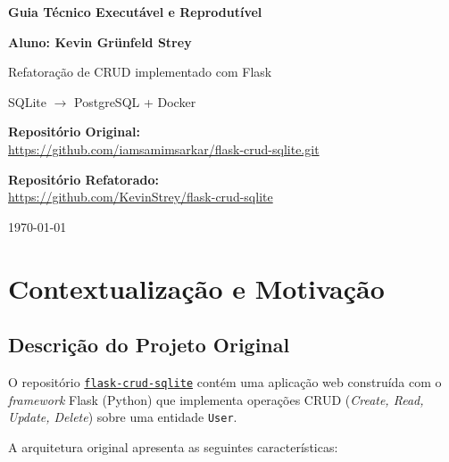 \documentclass[12pt,a4paper]{article}
\begin{document}
\begin{titlepage}
  \centering
  \vspace*{3cm}
  {\Huge\bfseries Guia Técnico Executável e Reprodutível\par}
  \vspace{0.5cm}
  {\Large\bfseries Aluno: Kevin Grünfeld Strey\par}
  \vspace{0.5cm}
  {\LARGE Refatoração de CRUD implementado com Flask\par}
  \vspace{0.3cm}
  {\Large SQLite $\rightarrow$ PostgreSQL + Docker\par}
  \vspace{2cm}
  {\large
    \textbf{Repositório Original:}\\[4pt]
    \url{https://github.com/iamsamimsarkar/flask-crud-sqlite.git}
  \par}
  \vspace{0.65cm}
  {\large
    \textbf{Repositório Refatorado:}\\[4pt]
    \url{https://github.com/KevinStrey/flask-crud-sqlite}
  \par}
  \vspace{2cm}
  {\large \today\par}
  \vfill
\end{titlepage}

\tableofcontents
\newpage

\section{Contextualização e Motivação}
\label{sec:contextualizacao}

\subsection{Descrição do Projeto Original}

O repositório
\href{https://github.com/iamsamimsarkar/flask-crud-sqlite.git}{\texttt{flask-crud-sqlite}}
contém uma aplicação web construída com o \textit{framework} Flask (Python) que implementa
operações CRUD (\textit{Create, Read, Update, Delete}) sobre uma entidade \texttt{User}.

A arquitetura original apresenta as seguintes características:
\end{document}
